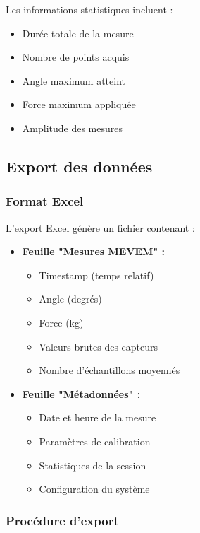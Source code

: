\documentclass[12pt,a4paper]{article}
\begin{document}
Les informations statistiques incluent :
\begin{itemize}
    \item Durée totale de la mesure
    \item Nombre de points acquis
    \item Angle maximum atteint
    \item Force maximum appliquée
    \item Amplitude des mesures
\end{itemize}

\subsection{Export des données}

\subsubsection{Format Excel}

L'export Excel génère un fichier contenant :

\begin{itemize}
    \item \textbf{Feuille "Mesures MEVEM" :}
    \begin{itemize}
        \item Timestamp (temps relatif)
        \item Angle (degrés)
        \item Force (kg)
        \item Valeurs brutes des capteurs
        \item Nombre d'échantillons moyennés
    \end{itemize}
    
    \item \textbf{Feuille "Métadonnées" :}
    \begin{itemize}
        \item Date et heure de la mesure
        \item Paramètres de calibration
        \item Statistiques de la session
        \item Configuration du système
    \end{itemize}
\end{itemize}

\subsubsection{Procédure d'export}
\end{document}
